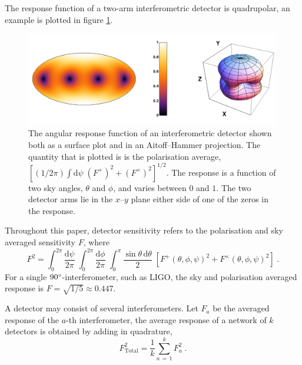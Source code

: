 The response function of a two-arm interferometric detector is quadrupolar, an example is plotted in figure \ref{fig:LIGO}.
\begin{figure}
 \centering
 \includegraphics[trim=0cm 0cm 0cm 0cm, width=0.99\textwidth]{LIGO_detectorframe.pdf}
 \caption{The angular response function of an interferometric detector shown both as a surface plot and in an Aitoff--Hammer projection. The quantity that is plotted is is the polarisation average, $\left[(1/2\pi)\int\mathrm{d}\psi \;(F^{+})^{2}+(F^{\times})^{2}\right]^{1/2}$. The response is a function of two sky angles, $\theta$ and $\phi$, and varies between $0$ and $1$. The two detector arms lie in the $x$--$y$ plane either side of one of the zeros in the response.}
 \label{fig:LIGO}
\end{figure}
Throughout this paper, detector sensitivity refers to the polarisation and sky averaged sensitivity $F$, where
\begin{equation}\label{eq:skyav}
F^{2}=\int_{0}^{2\pi}\frac{\mathrm{d}\psi}{2\pi}\; \int_{0}^{2\pi} \frac{\mathrm{d}\phi}{2\pi}\; \int_{0}^{\pi}\frac{\sin\theta\,\mathrm{d}\theta}{2}\;\left[F^{+}\left(\theta,\phi,\psi\right)^{2}+F^{\times}\left(\theta,\phi,\psi\right)^{2}\right]\; .
\end{equation}
For a single $90^\circ$-interferometer, such as LIGO, the sky and polarisation averaged response is $F=\sqrt{1/5}\approx 0.447$.

A detector may consist of several interferometers. Let $F_{a}$ be the averaged response of the $a$-th interferometer, the average response of a network of $k$ detectors is obtained by adding in quadrature,
\begin{equation} F_{\mathrm{Total}}^{2}=\frac{1}{k}\sum_{a\,=\,1}^{k}F_{a}^{2} \; .\end{equation}

